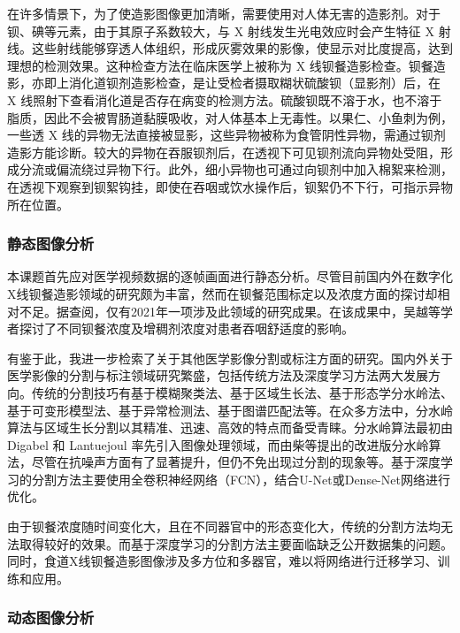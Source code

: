 在许多情景下，为了使造影图像更加清晰，需要使用对人体无害的造影剂。对于钡、碘等元素，由于其原子系数较大，与 X 射线发生光电效应时会产生特征 X 射线。这些射线能够穿透人体组织，形成灰雾效果的影像，使显示对比度提高，达到理想的检测效果。这种检查方法在临床医学上被称为 X 线钡餐造影检查。钡餐造影，亦即上消化道钡剂造影检查，是让受检者摄取糊状硫酸钡（显影剂）后，在 X 线照射下查看消化道是否存在病变的检测方法。硫酸钡既不溶于水，也不溶于脂质，因此不会被胃肠道黏膜吸收，对人体基本上无毒性。以果仁、小鱼刺为例，一些透 X 线的异物无法直接被显影，这些异物被称为食管阴性异物，需通过钡剂造影方能诊断。较大的异物在吞服钡剂后，在透视下可见钡剂流向异物处受阻，形成分流或偏流绕过异物下行。此外，细小异物也可通过向钡剂中加入棉絮来检测，在透视下观察到钡絮钩挂，即使在吞咽或饮水操作后，钡絮仍不下行，可指示异物所在位置。

\subsubsection{静态图像分析}

本课题首先应对医学视频数据的逐帧画面进行静态分析。尽管目前国内外在数字化X线钡餐造影领域的研究颇为丰富，然而在钡餐范围标定以及浓度方面的探讨却相对不足。据查阅，仅有2021年一项涉及此领域的研究成果。在该成果中，吴越等学者探讨了不同钡餐浓度及增稠剂浓度对患者吞咽舒适度的影响\cite{wu2021}。

有鉴于此，我进一步检索了关于其他医学影像分割或标注方面的研究。国内外关于医学影像的分割与标注领域研究繁盛，包括传统方法及深度学习方法两大发展方向。传统的分割技巧有基于模糊聚类法、基于区域生长法、基于形态学分水岭法、基于可变形模型法、基于异常检测法、基于图谱匹配法等。在众多方法中，分水岭算法与区域生长分割以其精准、迅速、高效的特点而备受青睐。分水岭算法最初由 Digabel 和 Lantuejoul 率先引入图像处理领域\cite{wang2009watershed}，而由柴\cite{chai2007watershed}等提出的改进版分水岭算法，尽管在抗噪声方面有了显著提升，但仍不免出现过分割的现象等。基于深度学习的分割方法主要使用全卷积神经网络（FCN）\cite{2015Fully}，结合U-Net\cite{Ronneberger2015}或Dense-Net\cite{huang2017densely}网络进行优化。

由于钡餐浓度随时间变化大，且在不同器官中的形态变化大，传统的分割方法均无法取得较好的效果。而基于深度学习的分割方法主要面临缺乏公开数据集的问题。同时，食道X线钡餐造影图像涉及多方位和多器官，难以将网络进行迁移学习、训练和应用。

\subsubsection{动态图像分析}

